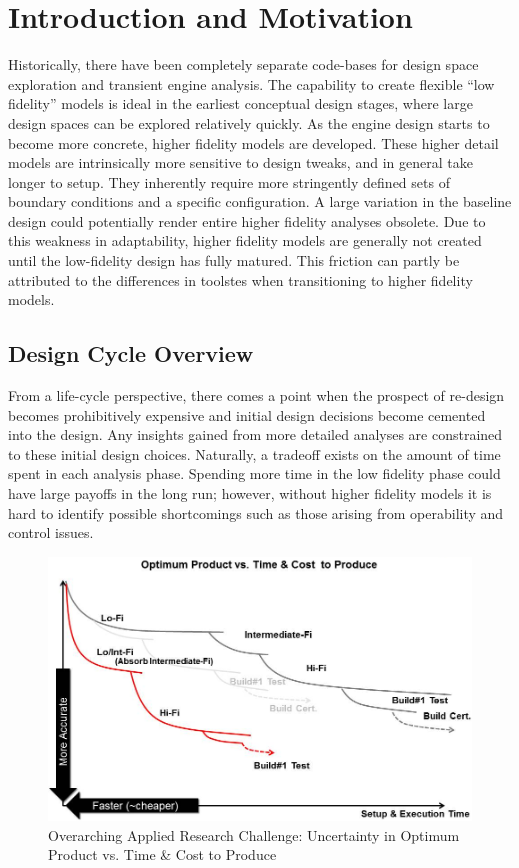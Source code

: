 \documentclass[heading.tex]{subfiles}
\begin{document}

\section{Introduction and Motivation}
Historically, there have been completely separate code-bases for design space exploration and
transient engine analysis. The capability to create flexible ``low fidelity'' models is ideal in
the earliest  conceptual design stages, where large design spaces can be explored relatively
quickly. As the engine design starts to become more concrete, higher fidelity models are
developed. These higher detail models are intrinsically more sensitive to design tweaks, and in
general take longer to setup. They inherently require more stringently defined sets of boundary
conditions and a specific configuration. A large variation in the baseline design could
potentially render entire higher fidelity analyses obsolete. Due to this weakness in adaptability,
higher fidelity models are generally not created until the low-fidelity design has fully matured.
This friction can partly be attributed to the differences in toolstes when transitioning to higher
fidelity models. 

\subsection{Design Cycle Overview}

	From a life-cycle perspective, there comes a point when the prospect of re-design becomes
prohibitively expensive and initial design decisions become cemented into the design. Any insights
gained from more detailed analyses are constrained to these initial design choices. Naturally, a
tradeoff exists on the amount of time spent in each analysis phase. Spending more time in the low
fidelity phase could have large payoffs in the long run; however, without higher fidelity models
it is hard to identify possible shortcomings such as those arising from operability and control
issues.

\begin{figure}[H]
\centering
\includegraphics[width=1.0\textwidth]{images/optimum_product_vs_time}
\caption{Overarching Applied Research Challenge: Uncertainty in Optimum Product vs. Time \& Cost to Produce}
\label{f:product_vs_time}
\end{figure}
\end{document}
